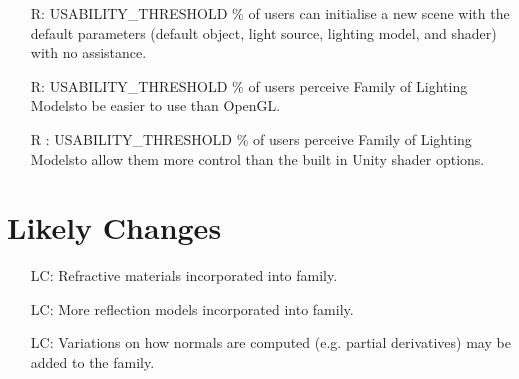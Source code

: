 \documentclass[12pt]{article}
\newcounter{reqnum} %
\newcounter{lcnum} %
\newcommand{\famname}{Family of Lighting Models} %
\begin{document}
\begin{itemize}
	USABILITY\_THRESHOLD \% of users can change the parameters of the lighting 
	models and re-render an existing scene with no assistance.
	\item[R\refstepcounter{reqnum}\thereqnum \label{NFR-Usability-new}:] 
	USABILITY\_THRESHOLD \% of users can initialise a new scene with the 
	default parameters (default object, light source, lighting model, and 
	shader) with no assistance.
	\item[R\refstepcounter{reqnum}\thereqnum \label{NFR-Usability-perceived}:] 
	USABILITY\_THRESHOLD \% of users perceive \famname to be easier to use than 
	OpenGL.
	\item[R\refstepcounter{reqnum}\thereqnum 
	\label{NFR-Usability-control-perceived}:] 
	USABILITY\_THRESHOLD \% of users perceive \famname to allow them more 
	control than the built in Unity shader options.
\end{itemize}


\section{Likely Changes}    

\noindent \begin{itemize}

\item[LC\refstepcounter{lcnum}\thelcnum\label{LC_refraction}:] Refractive 
materials incorporated into family.
\item[LC\refstepcounter{lcnum}\thelcnum\label{LC_reflection_models}:] More 
reflection models incorporated into family.
\item[LC\refstepcounter{lcnum}\thelcnum\label{LC_normals}:] Variations on how 
normals are computed (e.g. partial derivatives) may be added to the family.

\end{itemize}
\end{document}
